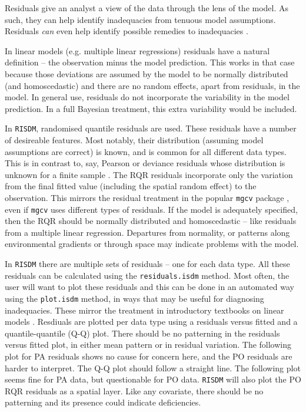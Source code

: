 \documentclass[article,shortnames,nojss]{jss}\usepackage[]{graphicx}\usepackage[]{xcolor}
\begin{document}
Residuals give an analyst a view of the data through the lens of the model. As such, they can help identify inadequacies from tenuous model assumptions. Residuals \textit{can} even help identify possible remedies to inadequacies \citep[e.g.][]{net96}.
  
In linear models (e.g. multiple linear regressions) residuals have a natural definition -- the observation minus the model prediction. This works in that case because those deviations are assumed by the model to be normally distributed (and homoscedastic) and there are no random effects, apart from residuals, in the model. In general use, residuals do not incorporate the variability in the model prediction. In a full Bayesian treatment, this extra variability would be included.
  
In \texttt{RISDM}, randomised quantile residuals \citep[RQR;][]{dun96} are used. These residuals have a number of desireable features. Most notably, their distribution (assuming model assumptions are correct) is known, and is common for all different data types. This is in contrast to, say, Pearson or deviance residuals whose distribution is unknown for a finite sample \citep{dun96}. The RQR residuals incorporate only the variation from the final fitted value (including the spatial random effect) to the observation. This mirrors the residual treatment in the popular \texttt{mgcv} package \citep{woo17}, even if \texttt{mgcv} uses different types of residuals. If the model is adequately specified, then the RQR should be normally distributed and homoscedastic -- like residuals from a multiple linear regression. Departures from normality, or patterns along environmental gradients or through space may indicate problems with the model.
  
In \texttt{RISDM} there are multiple sets of residuals -- one for each data type. All these residuals can be calculated using the \texttt{residuals.isdm} method. Most often, the user will want to plot these residuals and this can be done in an automated way using the \texttt{plot.isdm} method, in ways that may be useful for diagnosing inadequacies. These mirror the treatment in introductory textbooks on linear models \citep[e.g.][]{net96}. Resdiuals are plotted per data type using a residuals versus fitted and a quantile-quantile (Q-Q) plot. There should be no patterning in the residuals versus fitted plot, in either mean pattern or in residual variation. The following plot for PA residuals shows no cause for concern here, and the PO residuals are harder to interpret. The Q-Q plot should follow a straight line. The following plot seems fine for PA data, but questionable for PO data. \texttt{RISDM} will also plot the PO RQR residuals as a spatial layer. Like any covariate, there should be no patterning and its presence could indicate deficiencies.
  
\end{document}
